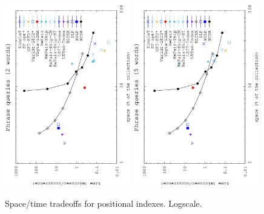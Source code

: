 \documentclass[review]{elsarticle}
\begin{document}
\begin{figure}[t]
\begin{center}
\includegraphics[angle=-90,width=0.49\textwidth]{../figures/f4/phrases2-2/locate-2_2.eps}
\includegraphics[angle=-90,width=0.49\textwidth]{../figures/f4/phrases5-5/locate-5_5.eps}
\caption{Space/time tradeoffs for positional indexes. Logscale.}
\label{fig:pos2.2}
\end{center}
\end{figure}
\end{document}
